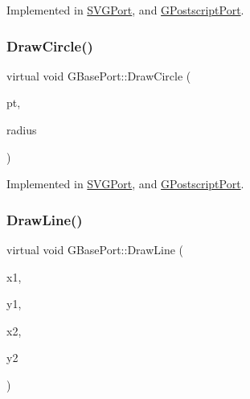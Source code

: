 Implemented in \mbox{\hyperlink{class_s_v_g_port_aa849012cbcbb27a9db820cee968093c9}{S\+V\+G\+Port}}, and \mbox{\hyperlink{class_g_postscript_port_a9930f5d5cf8d6efb04af048a3ab72a3f}{G\+Postscript\+Port}}.

\mbox{\label{class_g_base_port_a7dbdd13c9a8f60537e7915a7991ab0f0}} 
\subsubsection{\texorpdfstring{Draw\+Circle()}{DrawCircle()}}
{\footnotesize\ttfamily virtual void G\+Base\+Port\+::\+Draw\+Circle (\begin{DoxyParamCaption}\item[{const \mbox{\hyperlink{class_g_point}{G\+Point}} \&}]{pt,  }\item[{const int}]{radius }\end{DoxyParamCaption})\hspace{0.3cm}{\ttfamily [pure virtual]}}



Implemented in \mbox{\hyperlink{class_s_v_g_port_a9aba350c03b01d93168882746b18ec07}{S\+V\+G\+Port}}, and \mbox{\hyperlink{class_g_postscript_port_a859f59aeb691f0a9072aacc555417bb5}{G\+Postscript\+Port}}.

\mbox{\label{class_g_base_port_a9e19a5d97e629c3d19be31e1938504c1}} 
\subsubsection{\texorpdfstring{Draw\+Line()}{DrawLine()}}
{\footnotesize\ttfamily virtual void G\+Base\+Port\+::\+Draw\+Line (\begin{DoxyParamCaption}\item[{const int}]{x1,  }\item[{const int}]{y1,  }\item[{const int}]{x2,  }\item[{const int}]{y2 }\end{DoxyParamCaption})\hspace{0.3cm}{\ttfamily [pure virtual]}}



